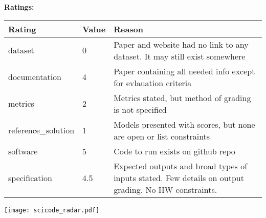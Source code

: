 {{{\bf Ratings:} ~ \\

\begin{tabular}{p{} p{} p{}}
\hline
Rating & Value & Reason \\
\hline
dataset & 0 & Paper and website had no link to any dataset. It may still exist somewhere
 \\
documentation & 4 & Paper containing all needed info except for evlauation criteria
 \\
metrics & 2 & Metrics stated, but method of grading is not specified
 \\
reference\_solution & 1 & Models presented with scores, but none are open or list constraints
 \\
software & 5 & Code to run exists on github repo
 \\
specification & 4.5 & Expected outputs and broad types of inputs stated. Few details on output grading. No HW constraints.
 \\
\hline
\end{tabular}

\texttt{[image: scicode\_radar.pdf]}
}}
\clearpage